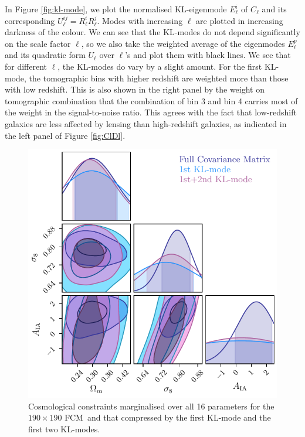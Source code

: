 \documentclass[twocolumn]{\docclass}
\newcommand{\rf}[1]{Figure \ref{fig:#1}}
\newcommand\full{FCM}
\begin{document}
	
	In \rf{kl-mode}, we plot the normalised KL-eigenmode $E_\ell^i$ of $C_{\ell}$ and its corresponding $U^{ij}_\ell=R_\ell^i R_\ell^j$. Modes with increasing $\ell$ are plotted in increasing darkness of the colour. We can see that the KL-modes do not depend significantly on the scale factor $\ell$, so we also take the weighted average of the eigenmodes $E_\ell^p$ and its quadratic form $U_\ell$ over $\ell$'s and plot them with black lines. 	We see that for different $\ell$, the KL-modes do vary by a slight amount. For the first KL-mode, the tomographic bins with higher redshift are weighted more than those with low redshift. This is also shown in the right panel by the weight on tomographic combination that the combination of bin 3 and bin 4 carries most of the weight in the signal-to-noise ratio. This agrees with the fact that low-redshift galaxies are less affected by lensing than high-redshift galaxies, as indicated in the left panel of Figure \ref{fig:ClDl}.
	
	\begin{figure}[b]
		\includegraphics[width=\columnwidth]{CompKL-constraints_wmS8A.pdf}
		\caption{Cosmological constraints marginalised over all 16 parameters for the  $190 \times 190$ \full\ and that compressed by the first KL-mode and the first two KL-modes.\label{fig:CompKL-constraints_wmS8A}}
	\end{figure}
	
\end{document}
